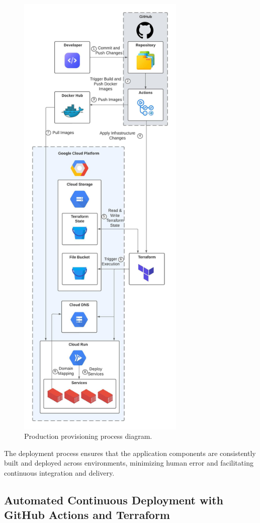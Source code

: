 \documentclass[a4paper,fleqn]{cas-dc}
\begin{document}
\begin{figure}[h]
\centering
\includegraphics[width=8cm]{provisioning.jpeg}
\caption{Production provisioning process diagram.}
\label{fig:deployment}
\end{figure}


The deployment process ensures that the application components are consistently built and deployed across environments, minimizing human error and facilitating continuous integration and delivery.

\subsection{Automated Continuous Deployment with GitHub Actions and Terraform}
\end{document}
